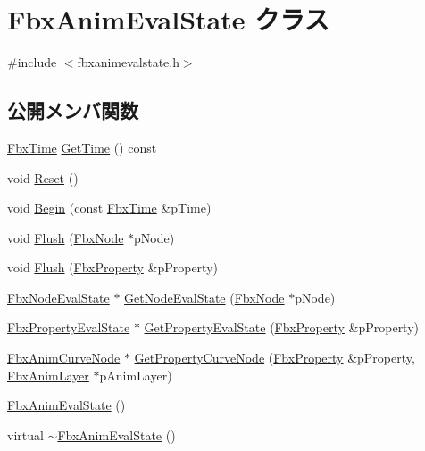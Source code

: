\hypertarget{class_fbx_anim_eval_state}{}\section{Fbx\+Anim\+Eval\+State クラス}
\label{class_fbx_anim_eval_state}


{\ttfamily \#include $<$fbxanimevalstate.\+h$>$}

\subsection*{公開メンバ関数}
\begin{DoxyCompactItemize}
\item 
\hyperlink{class_fbx_time}{Fbx\+Time} \hyperlink{class_fbx_anim_eval_state_ad6674f0c37ecd45c15dcfbc220f8faff}{Get\+Time} () const
\item 
void \hyperlink{class_fbx_anim_eval_state_a34be9a999fc7dfa426307b4778a50344}{Reset} ()
\item 
void \hyperlink{class_fbx_anim_eval_state_aff48b77374c628e0e5e02d0dcb5aee55}{Begin} (const \hyperlink{class_fbx_time}{Fbx\+Time} \&p\+Time)
\item 
void \hyperlink{class_fbx_anim_eval_state_a7e647a8391cf8f0356e38e0fd86f5310}{Flush} (\hyperlink{class_fbx_node}{Fbx\+Node} $\ast$p\+Node)
\item 
void \hyperlink{class_fbx_anim_eval_state_aaeebbdfac04c6dbe42c992bc484698c3}{Flush} (\hyperlink{class_fbx_property}{Fbx\+Property} \&p\+Property)
\item 
\hyperlink{class_fbx_node_eval_state}{Fbx\+Node\+Eval\+State} $\ast$ \hyperlink{class_fbx_anim_eval_state_a2aedc029a4b2870a2d2112111a450ded}{Get\+Node\+Eval\+State} (\hyperlink{class_fbx_node}{Fbx\+Node} $\ast$p\+Node)
\item 
\hyperlink{class_fbx_property_eval_state}{Fbx\+Property\+Eval\+State} $\ast$ \hyperlink{class_fbx_anim_eval_state_a43703fd0f0799332d5840a6f4b549081}{Get\+Property\+Eval\+State} (\hyperlink{class_fbx_property}{Fbx\+Property} \&p\+Property)
\item 
\hyperlink{class_fbx_anim_curve_node}{Fbx\+Anim\+Curve\+Node} $\ast$ \hyperlink{class_fbx_anim_eval_state_aa8ad680f208af36dd8f7864cf3449217}{Get\+Property\+Curve\+Node} (\hyperlink{class_fbx_property}{Fbx\+Property} \&p\+Property, \hyperlink{class_fbx_anim_layer}{Fbx\+Anim\+Layer} $\ast$p\+Anim\+Layer)
\item 
\hyperlink{class_fbx_anim_eval_state_a580a41fcddf592e7c4466a26648392c1}{Fbx\+Anim\+Eval\+State} ()
\item 
virtual \hyperlink{class_fbx_anim_eval_state_a571cadbab0fda535e1b0a5f650307342}{$\sim$\+Fbx\+Anim\+Eval\+State} ()
\end{DoxyCompactItemize}


